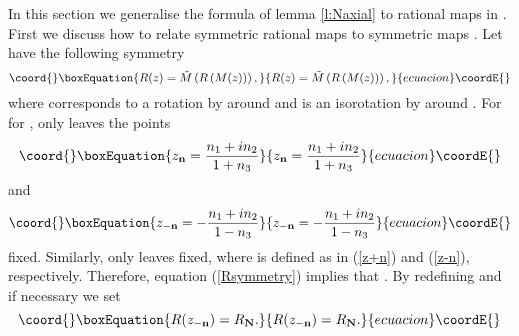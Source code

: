 \documentclass[a4paper,12pt]{article}
\begin{document}
In this section we generalise the formula of lemma \ref{l:Naxial} to 
rational maps in \coordHE{}. 
First we discuss how to relate symmetric rational maps \coordHE{} to symmetric maps \coordHE{}. Let \coordHE{} have the following symmetry
%
\begin{equation}\coord{}\boxEquation{
\label{Rsymmetry}
R(z) = {\tilde M} \left(R \left( M(z) \right) \right),
}{
R(z) = {\tilde M} \left(R \left( M(z) \right) \right),
}{ecuacion}\coordE{}\end{equation}
%
where \coordHE{} corresponds to a rotation by \myHighlight{$\alpha$}\coordHE{} around \coordHE{} and 
\coordHE{} is an isorotation by \myHighlight{$\beta$}\coordHE{} around \coordHE{}. 
For \coordHE{} for \coordHE{}, \coordHE{} only leaves the 
points
%
\begin{equation}\coord{}\boxEquation{
\label{z+n}
z_{{\bf n}} = \frac{n_1 + i n_2}{1 + n_3} 
}{
z_{{\bf n}} = \frac{n_1 + i n_2}{1 + n_3} 
}{ecuacion}\coordE{}\end{equation}
%
and
%
\begin{equation}\coord{}\boxEquation{
\label{z-n}
z_{-{\bf n}} = - \frac{n_1 + i n_2}{1 - n_3}
}{
z_{-{\bf n}} = - \frac{n_1 + i n_2}{1 - n_3}
}{ecuacion}\coordE{}\end{equation}
%
fixed. Similarly, \coordHE{} only leaves \coordHE{} fixed, where
\coordHE{} is defined as in (\ref{z+n}) and (\ref{z-n}),
respectively.
Therefore, equation (\ref{Rsymmetry}) implies that \coordHE{}. By redefining \coordHE{} and \myHighlight{$\beta$}\coordHE{} if necessary we set  
%
\begin{equation}\coord{}\boxEquation{
R(z_{-{\bf n}}) = R_{{\bf N}}.
}{
R(z_{-{\bf n}}) = R_{{\bf N}}.
}{ecuacion}\coordE{}\end{equation}
%
\end{document}
